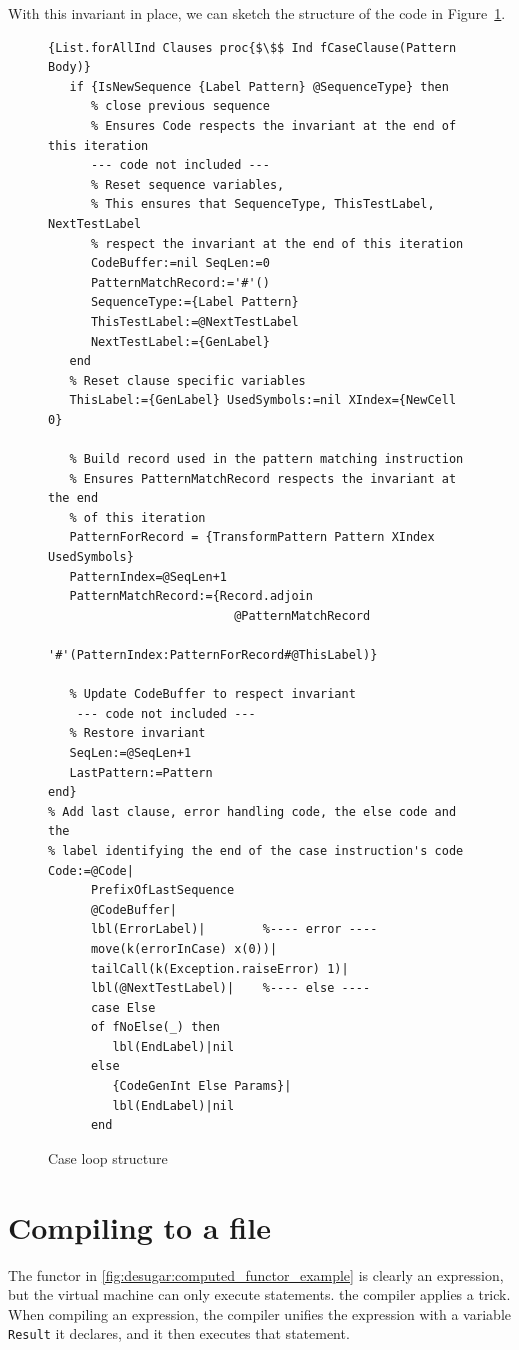 \documentclass[a4paper]{memoir}
\begin{document}
With this invariant in place, we can sketch the structure of the code 
in Figure~\ref{fig:caseloop}.
\begin{figure}[H]
\begin{lstlisting}[mathescape]
{List.forAllInd Clauses proc{$\$$ Ind fCaseClause(Pattern Body)}
   if {IsNewSequence {Label Pattern} @SequenceType} then
      % close previous sequence
      % Ensures Code respects the invariant at the end of this iteration
      --- code not included ---
      % Reset sequence variables, 
      % This ensures that SequenceType, ThisTestLabel, NextTestLabel 
      % respect the invariant at the end of this iteration
      CodeBuffer:=nil SeqLen:=0
      PatternMatchRecord:='#'()
      SequenceType:={Label Pattern}
      ThisTestLabel:=@NextTestLabel
      NextTestLabel:={GenLabel}
   end
   % Reset clause specific variables 
   ThisLabel:={GenLabel} UsedSymbols:=nil XIndex={NewCell 0}

   % Build record used in the pattern matching instruction
   % Ensures PatternMatchRecord respects the invariant at the end 
   % of this iteration
   PatternForRecord = {TransformPattern Pattern XIndex UsedSymbols}
   PatternIndex=@SeqLen+1
   PatternMatchRecord:={Record.adjoin 
                          @PatternMatchRecord 
                          '#'(PatternIndex:PatternForRecord#@ThisLabel)}

   % Update CodeBuffer to respect invariant
    --- code not included ---
   % Restore invariant
   SeqLen:=@SeqLen+1
   LastPattern:=Pattern
end}
% Add last clause, error handling code, the else code and the 
% label identifying the end of the case instruction's code
Code:=@Code|
      PrefixOfLastSequence
      @CodeBuffer|
      lbl(ErrorLabel)|        %---- error ----
      move(k(errorInCase) x(0))|
      tailCall(k(Exception.raiseError) 1)|
      lbl(@NextTestLabel)|    %---- else ----
      case Else
      of fNoElse(_) then
         lbl(EndLabel)|nil
      else
         {CodeGenInt Else Params}|
         lbl(EndLabel)|nil
      end
\end{lstlisting}
\caption{Case loop structure}
\label{fig:caseloop}
\end{figure}




\section{Compiling to a file}

The functor in \ref{fig:desugar:computed_functor_example} is clearly an
expression, but the virtual machine can only execute statements. the compiler 
applies a trick. When compiling an expression, the compiler unifies the
expression with a variable \lstinline!Result! it declares, and it then executes that statement.
\end{document}
